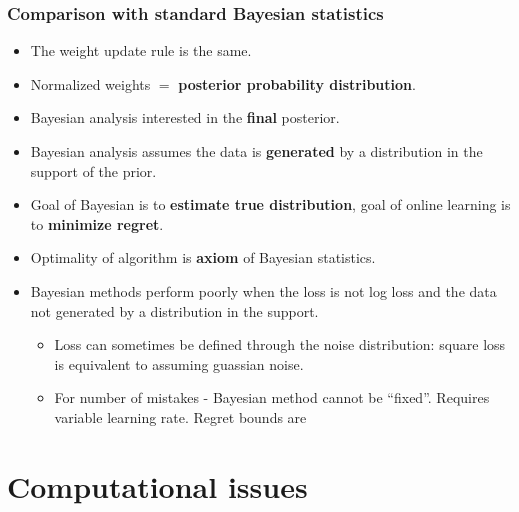 \documentclass{beamer}
\begin{document}
\begin{frame}
\frametitle{Comparison with standard Bayesian statistics}
\begin{itemize}
\item The weight update rule is the same.
\item Normalized weights $=$ {\bf posterior probability  distribution}.
\item Bayesian analysis interested in the {\bf final} posterior.
\item Bayesian analysis assumes the data is {\bf generated} 
by a distribution in the support of the prior.
\item Goal of Bayesian is to {\bf estimate true distribution}, 
goal of online learning is to {\bf minimize regret}.
\item Optimality of algorithm is {\bf axiom} of Bayesian statistics.
\item Bayesian methods perform poorly when the loss is not log loss
  and the data not generated by a distribution in the support.
\begin{itemize}
\item
Loss can sometimes be defined through the noise distribution: square loss is equivalent to assuming guassian noise.
\item
For number of mistakes - Bayesian method cannot be ``fixed''. Requires
variable learning rate. Regret bounds are 
\end{itemize}
\end{itemize}
\end{frame}


\section{Computational issues}
\end{document}

